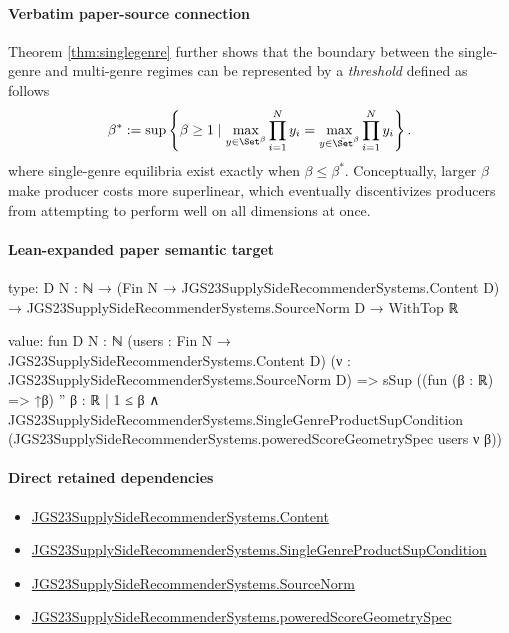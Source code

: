 \documentclass[10pt]{article}
\begin{document}
\paragraph{Verbatim paper-source connection}
\begin{ReviewVerbatim}
Theorem \ref{thm:singlegenre} further shows that the boundary between the single-genre and multi-genre regimes can be represented by a \textit{threshold} defined as follows
\[\beta^* := \sup \left\{\beta \ge 1 \mid \max_{y \in \Set^{\beta}} \prod_{i=1}^{N} y_i  = \max_{y \in \bar{\Set}^{\beta}} \prod_{i=1}^{N} y_i \right\}. \]
where single-genre equilibria exist exactly when $\beta \leq \beta^*$. Conceptually, larger $\beta$ make producer costs more superlinear, which eventually discentivizes producers from attempting to perform well on all dimensions at once.
\end{ReviewVerbatim}



\paragraph{Lean-expanded paper semantic target}
\begin{ReviewVerbatim}
type:
{D N : ℕ} →
  (Fin N → JGS23SupplySideRecommenderSystems.Content D) → JGS23SupplySideRecommenderSystems.SourceNorm D → WithTop ℝ

value:
fun {D N : ℕ} (users : Fin N → JGS23SupplySideRecommenderSystems.Content D)
    (ν : JGS23SupplySideRecommenderSystems.SourceNorm D) =>
  sSup
    ((fun (β : ℝ) => ↑β) ''
      {β : ℝ |
        1 ≤ β ∧
          JGS23SupplySideRecommenderSystems.SingleGenreProductSupCondition
            (JGS23SupplySideRecommenderSystems.poweredScoreGeometrySpec users ν β)})
\end{ReviewVerbatim}

\paragraph{Direct retained dependencies}
\begin{itemize}\raggedright
\item \hyperlink{governing-declaration-367305fda50f0ada}{JGS23\allowbreak{}Supply\allowbreak{}Side\allowbreak{}Recommender\allowbreak{}Systems.\allowbreak{}Content}
\item \hyperlink{governing-declaration-c26bf983a5931de7}{JGS23\allowbreak{}Supply\allowbreak{}Side\allowbreak{}Recommender\allowbreak{}Systems.\allowbreak{}Single\allowbreak{}Genre\allowbreak{}Product\allowbreak{}Sup\allowbreak{}Condition}
\item \hyperlink{governing-declaration-6141339a5d3412d9}{JGS23\allowbreak{}Supply\allowbreak{}Side\allowbreak{}Recommender\allowbreak{}Systems.\allowbreak{}Source\allowbreak{}Norm}
\item \hyperlink{paper-prerequisite-98c9dadb88a2e052}{JGS23\allowbreak{}Supply\allowbreak{}Side\allowbreak{}Recommender\allowbreak{}Systems.\allowbreak{}powered\allowbreak{}Score\allowbreak{}Geometry\allowbreak{}Spec}
\end{itemize}
\end{document}
